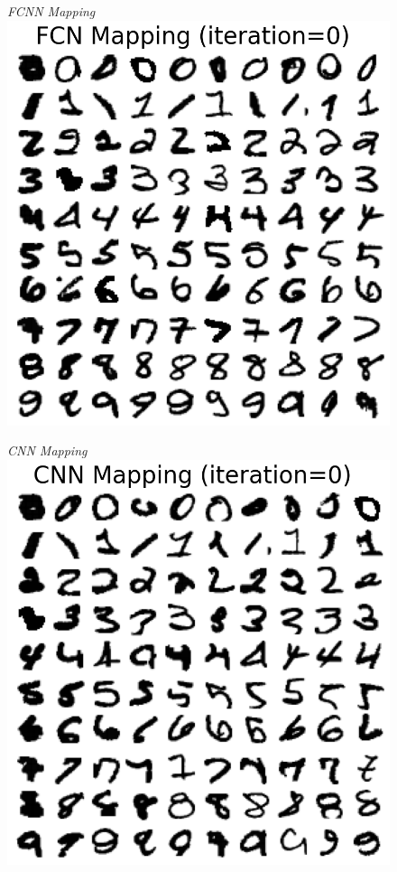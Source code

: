 \documentclass{article}
\numberwithin{equation}{section}
\begin{document}
\begin{figure}[h!]
\small
\centering
\begin{minipage}{.25\textwidth}
  \centering
  \textit{FCNN Mapping}
  \includegraphics[width=\linewidth, trim={0 0 0 1.5cm},clip]{thesis-report/figures/custom_mapping/fcn/iteration_0.png}
\end{minipage}%
\begin{minipage}{.25\textwidth}
  \centering
  \textit{CNN Mapping}
  \includegraphics[width=\linewidth, trim={0 0 0 1.5cm},clip]{thesis-report/figures/custom_mapping/cnn/iteration_0.png}

\end{minipage}
\end{figure}
\end{document}
